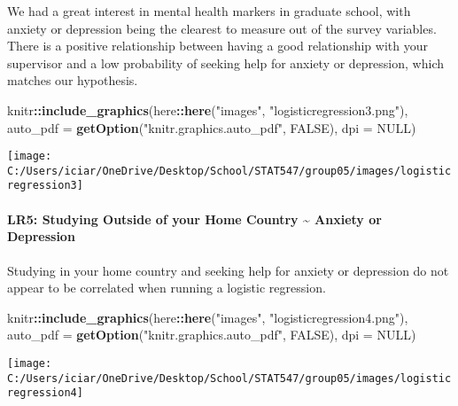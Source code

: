 \documentclass[
]{article}
\newenvironment{Shaded}{\begin{snugshade}}{\end{snugshade}}
\newcommand{\DataTypeTok}[1]{\textcolor[rgb]{0.13,0.29,0.53}{#1}}
\newcommand{\KeywordTok}[1]{\textcolor[rgb]{0.13,0.29,0.53}{\textbf{#1}}}
\newcommand{\NormalTok}[1]{#1}
\newcommand{\OperatorTok}[1]{\textcolor[rgb]{0.81,0.36,0.00}{\textbf{#1}}}
\newcommand{\OtherTok}[1]{\textcolor[rgb]{0.56,0.35,0.01}{#1}}
\newcommand{\StringTok}[1]{\textcolor[rgb]{0.31,0.60,0.02}{#1}}
\begin{document}
We had a great interest in mental health markers in graduate school,
with anxiety or depression being the clearest to measure out of the
survey variables. There is a positive relationship between having a good
relationship with your supervisor and a low probability of seeking help
for anxiety or depression, which matches our hypothesis.

\begin{Shaded}
\begin{Highlighting}[]
\NormalTok{knitr}\OperatorTok{::}\KeywordTok{include_graphics}\NormalTok{(here}\OperatorTok{::}\KeywordTok{here}\NormalTok{(}\StringTok{"images"}\NormalTok{, }\StringTok{"logisticregression3.png"}\NormalTok{), }\DataTypeTok{auto_pdf =} \KeywordTok{getOption}\NormalTok{(}\StringTok{"knitr.graphics.auto_pdf"}\NormalTok{, }\OtherTok{FALSE}\NormalTok{), }
    \DataTypeTok{dpi =} \OtherTok{NULL}\NormalTok{)}
\end{Highlighting}
\end{Shaded}

\texttt{[image: C:/Users/iciar/OneDrive/Desktop/School/STAT547/group05/images/logisticregression3]}

\hypertarget{lr5-studying-outside-of-your-home-country-anxiety-or-depression}{%
\paragraph{LR5: Studying Outside of your Home Country \textasciitilde{}
Anxiety or
Depression}\label{lr5-studying-outside-of-your-home-country-anxiety-or-depression}}

Studying in your home country and seeking help for anxiety or depression
do not appear to be correlated when running a logistic regression.

\begin{Shaded}
\begin{Highlighting}[]
\NormalTok{knitr}\OperatorTok{::}\KeywordTok{include_graphics}\NormalTok{(here}\OperatorTok{::}\KeywordTok{here}\NormalTok{(}\StringTok{"images"}\NormalTok{, }\StringTok{"logisticregression4.png"}\NormalTok{), }\DataTypeTok{auto_pdf =} \KeywordTok{getOption}\NormalTok{(}\StringTok{"knitr.graphics.auto_pdf"}\NormalTok{, }\OtherTok{FALSE}\NormalTok{), }
    \DataTypeTok{dpi =} \OtherTok{NULL}\NormalTok{)}
\end{Highlighting}
\end{Shaded}

\texttt{[image: C:/Users/iciar/OneDrive/Desktop/School/STAT547/group05/images/logisticregression4]}
\end{document}
